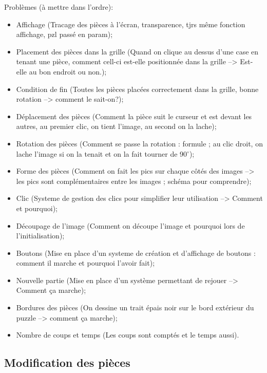 \documentclass[]{article}
\begin{document}
Problèmes (à mettre dans l'ordre):
\begin{itemize}
	\item
		Affichage (Tracage des pièces à l'écran, transparence, tjrs même fonction affichage, pzl passé en param);
	\item
		Placement des pièces dans la grille (Quand on clique au dessus d'une case en tenant une pièce, comment cell-ci est-elle positionnée dans la grille --> Est-elle au bon endroit ou non.);
	\item
		Condition de fin (Toutes les pièces placées correctement dans la grille, bonne rotation --> comment le sait-on?);
	\item
		Déplacement des pièces (Comment la pièce suit le curseur et est devant les autres, au premier clic, on tient l'image, au second on la lache);
	\item
		Rotation des pièces (Comment se passe la rotation : formule ; au clic droit, on lache l'image si on la tenait et on la fait tourner de 90$^\circ$);
	 \item
		Forme des pièces (Comment on fait les pics sur chaque côtés des images --> les pics sont complémentaires entre les images ; schéma pour comprendre);
	\item
		Clic (Systeme de gestion des clics pour simplifier leur utilisation --> Comment et pourquoi);
	\item
		Découpage de l'image (Comment on découpe l'image et pourquoi lors de l'initialisation);
	\item
		Boutons (Mise en place d'un systeme de création et d'affichage de boutons : comment il marche et pourquoi l'avoir fait);
	\item
		Nouvelle partie (Mise en place d'un système permettant de rejouer --> Comment ça marche);
	\item
		Bordures des pièces (On dessine un trait épais noir sur le bord extérieur du puzzle --> comment ça marche);
	\item
		Nombre de coups et temps (Les coups sont comptés et le temps aussi).
\end{itemize}


\subsection{Modification des pièces}
\end{document}
